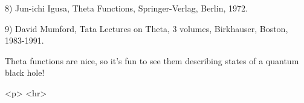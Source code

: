 8) Jun-ichi Igusa, Theta Functions, Springer-Verlag, Berlin, 1972.

9) David Mumford, Tata Lectures on Theta, 3 volumes, Birkhauser, Boston,
1983-1991.

Theta functions are nice, so it's fun to see them describing states of a
quantum black hole!


<p> <hr>



